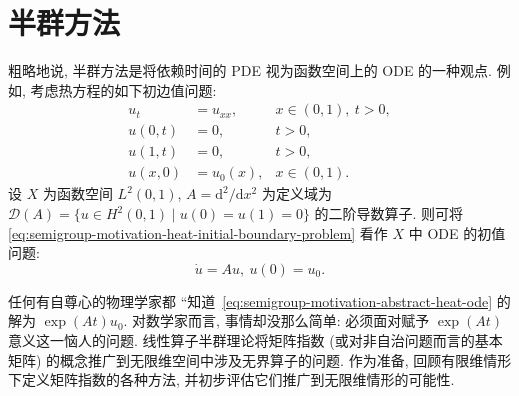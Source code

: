 \section{半群方法}\label{chap:semigroup-methods}

粗略地说, 半群方法是将依赖时间的 PDE 视为函数空间上的 ODE 的一种观点. 例如, 考虑热方程的如下初边值问题:
\begin{equation}\label{eq:semigroup-motivation-heat-initial-boundary-problem}
\begin{aligned}u_t&=u_{xx},&x\in(0,1),\ t>0,\\u(0,t)&=0,&t>0,\\u(1,t)&=0,&t>0,\\u(x,0)&=u_0(x),&x\in(0,1).\end{aligned}
\end{equation}
设 $X$ 为函数空间 $L^2(0,1)$, $A=\mathrm{d}^2/\mathrm{d}x^2$ 为定义域为 $\mathcal{D}(A)=\{u\in H^2(0,1)\mid u(0)=u(1)=0\}$ 的二阶导数算子. 则可将 \eqref{eq:semigroup-motivation-heat-initial-boundary-problem} 看作 $X$ 中 ODE 的初值问题:
\begin{equation}\label{eq:semigroup-motivation-abstract-heat-ode}
\dot u=Au,\ u(0)=u_0.
\end{equation}


任何有自尊心的物理学家都 ``知道\textquotesingle\textquotesingle\ \eqref{eq:semigroup-motivation-abstract-heat-ode} 的解为 $\exp(At)u_0$. 对数学家而言, 事情却没那么简单: 必须面对赋予 $\exp(At)$ 意义这一恼人的问题. 线性算子半群理论将矩阵指数 (或对非自治问题而言的基本矩阵) 的概念推广到无限维空间中涉及无界算子的问题. 作为准备, 回顾有限维情形下定义矩阵指数的各种方法, 并初步评估它们推广到无限维情形的可能性.

